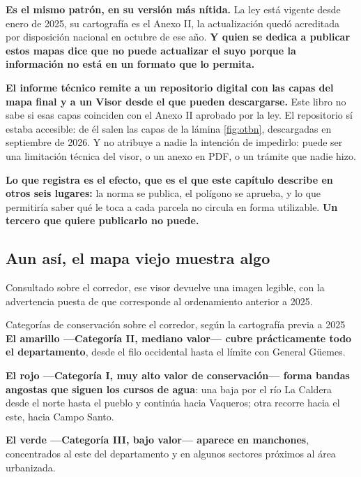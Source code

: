\begin{cautela}
\textbf{Es el mismo patrón, en su versión más nítida.} La ley está vigente desde enero de 2025,
su cartografía es el Anexo II, la actualización quedó acreditada por disposición nacional en
octubre de ese año. \textbf{Y quien se dedica a publicar estos mapas dice que no puede
actualizar el suyo porque la información no está en un formato que lo permita.}

\textbf{El informe técnico remite a un repositorio digital con las capas del mapa final y a un Visor desde el que pueden descargarse.} Este libro no sabe si esas capas coinciden con el Anexo II aprobado por la ley. El repositorio sí estaba accesible: de él salen las capas de la lámina \ref{fig:otbn}, descargadas en septiembre de 2026. Y no atribuye a nadie la intención de impedirlo: puede ser una limitación
técnica del visor, o un anexo en PDF, o un trámite que nadie hizo.

\textbf{Lo que registra es el efecto, que es el que este capítulo describe en otros seis
lugares:} la norma se publica, el polígono se aprueba, y lo que permitiría saber qué le toca a
cada parcela no circula en forma utilizable. \textbf{Un tercero que quiere publicarlo no puede.}
\end{cautela}

\subsection*{Aun así, el mapa viejo muestra algo}

Consultado sobre el corredor, ese visor devuelve una imagen legible, con la advertencia puesta
de que corresponde al ordenamiento anterior a 2025.

\begin{ficha}{Categorías de conservación sobre el corredor, según la cartografía previa a 2025}
\textbf{El amarillo ---Categoría II, mediano valor--- cubre prácticamente todo el
departamento}, desde el filo occidental hasta el límite con General Güemes.

\textbf{El rojo ---Categoría I, muy alto valor de conservación--- forma bandas angostas que
siguen los cursos de agua}: una baja por el río La Caldera desde el norte hasta el pueblo y
continúa hacia Vaqueros; otra recorre hacia el este, hacia Campo Santo.

\textbf{El verde ---Categoría III, bajo valor--- aparece en manchones}, concentrados al este del
departamento y en algunos sectores próximos al área urbanizada.
\end{ficha}

